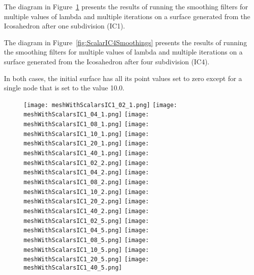 \documentclass{InsightArticle}
\begin{document}
The diagram in Figure~\ref{fig:ScalarIC1Smoothings} presents the results of
running the smoothing filters for multiple values of lambda and multiple
iterations on a surface generated from the Icosahedron after one subdivision
(IC1).

The diagram in Figure~\ref{fig:ScalarIC4Smoothings} presents the results of
running the smoothing filters for multiple values of lambda and multiple
iterations on a surface generated from the Icosahedron after four subdivision
(IC4).

In both cases, the initial surface has all its point values set to zero except
for a single node that is set to the value 10.0.

\begin{figure}
\center
\texttt{[image: meshWithScalarsIC1\_02\_1.png]}
\texttt{[image: meshWithScalarsIC1\_04\_1.png]}
\texttt{[image: meshWithScalarsIC1\_08\_1.png]}
\texttt{[image: meshWithScalarsIC1\_10\_1.png]}
\texttt{[image: meshWithScalarsIC1\_20\_1.png]}
\texttt{[image: meshWithScalarsIC1\_40\_1.png]}
\texttt{[image: meshWithScalarsIC1\_02\_2.png]}
\texttt{[image: meshWithScalarsIC1\_04\_2.png]}
\texttt{[image: meshWithScalarsIC1\_08\_2.png]}
\texttt{[image: meshWithScalarsIC1\_10\_2.png]}
\texttt{[image: meshWithScalarsIC1\_20\_2.png]}
\texttt{[image: meshWithScalarsIC1\_40\_2.png]}
\texttt{[image: meshWithScalarsIC1\_02\_5.png]}
\texttt{[image: meshWithScalarsIC1\_04\_5.png]}
\texttt{[image: meshWithScalarsIC1\_08\_5.png]}
\texttt{[image: meshWithScalarsIC1\_10\_5.png]}
\texttt{[image: meshWithScalarsIC1\_20\_5.png]}
\texttt{[image: meshWithScalarsIC1\_40\_5.png]}
\label{fig:ScalarIC1Smoothings}
\end{figure}
\end{document}
